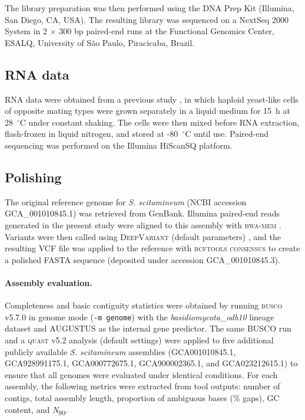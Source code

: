 \documentclass[Journal,letterpaper]{ascelike-new}
\begin{document}
The library preparation was then performed using the DNA Prep Kit
(Illumina, San Diego, CA, USA). The resulting library was sequenced
on a NextSeq 2000 System in 2 $\times$ 300 bp paired-end runs at the
Functional Genomics Center, ESALQ, University of São Paulo, Piracicaba, Brazil.

\subsection*{RNA data}

RNA data were obtained from a previous study \cite{sscita2015}, in
which haploid yeast-like cells of opposite mating types were grown
separately in a liquid medium for 15~h at 28~$^{\circ}$C under
constant shaking. The cells were then mixed before RNA extraction,
flash-frozen in liquid nitrogen, and stored at -80~$^{\circ}$C until
use. Paired-end sequencing was performed on the Illumina HiScanSQ platform.

\subsection*{Polishing}

The original reference genome for \textit{S. scitamineum} (NCBI
accession GCA\_001010845.1) \cite{sscita2015} was retrieved from
GenBank. Illumina paired-end reads generated in the present study
were aligned to this assembly with \textsc{bwa-mem} \cite{bwamem}.
Variants were then called using \textsc{DeepVariant} (default
parameters) \cite{deepvariant2018}, and the resulting VCF file was
applied to the reference with \textsc{bcftools consensus}
\cite{samtools} to create a polished FASTA sequence (deposited under
accession GCA\_001010845.3).

\paragraph{Assembly evaluation.} Completeness and basic contiguity
statistics were obtained by running \textsc{busco} v5.7.0
\cite{busco} in genome mode (\texttt{-m genome}) with the
\textit{basidiomycota\_odb10} lineage dataset and \textsc{AUGUSTUS}
as the internal gene predictor. The same BUSCO run and a
\textsc{quast} v5.2 analysis (default settings) were applied to five
additional publicly available \textit{S. scitamineum} assemblies
(GCA001010845.1, GCA928991175.1, GCA000772675.1, GCA900002365.1, and
GCA023212615.1) to ensure that all genomes were evaluated under
identical conditions. For each assembly, the following metrics were
extracted from tool outputs: number of contigs, total assembly
length, proportion of ambiguous bases (\% gaps), GC content, and
\textit{N}\textsubscript{90}.
\end{document}
